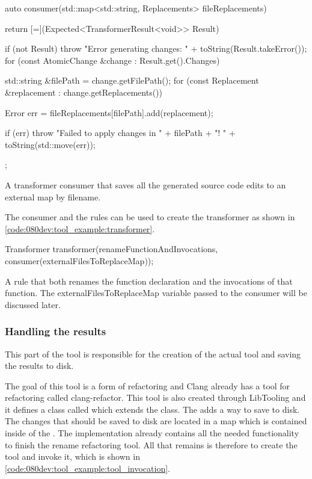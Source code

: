 \begin{listing}[H]
    \begin{cppcode}
auto consumer(std::map<std::string, Replacements> fileReplacements) {
    return [=](Expected<TransformerResult<void>> Result) {
        if (not Result) {
            throw "Error generating changes: " + toString(Result.takeError());
        }
        for (const AtomicChange &change : Result.get().Changes) {
            std::string &filePath = change.getFilePath();
            for (const Replacement &replacement : change.getReplacements()) {
                Error err = fileReplacements[filePath].add(replacement);

                if (err) {
                    throw "Failed to apply changes in " + filePath + "! " + toString(std::move(err));
                }
            }
        }
    };
}
    \end{cppcode}
    \caption{A transformer consumer that saves all the generated source code edits to an external map by filename.}
    \label{code:080dev:tool_example:consumer}
\end{listing}

The consumer and the rules can be used to create the transformer as shown in \cref{code:080dev:tool_example:transformer}.

\begin{listing}[H]
    \begin{cppcode}
Transformer transformer(renameFunctionAndInvocations, consumer(externalFilesToReplaceMap));
    \end{cppcode}
    \caption{A rule that both renames the function declaration and the invocations of that function. The externalFilesToReplaceMap variable passed to the consumer will be discussed later.}
    \label{code:080dev:tool_example:transformer}
\end{listing}

\subsubsection*{Handling the results}

This part of the tool is responsible for the creation of the actual tool and saving the results to disk. 

The goal of this tool is a form of refactoring and Clang already has a tool for refactoring called clang-refactor. This tool is also created through LibTooling and it defines a class called  which extends the  class. The  adds a way to save  to disk. The changes that should be saved to disk are located in a  map which is contained inside of the . The  implementation already contains all the needed functionality to finish the rename refactoring tool. All that remains is therefore to create the tool and invoke it, which is shown in \cref{code:080dev:tool_example:tool_invocation}.


